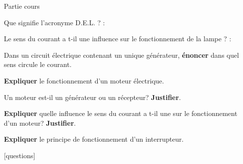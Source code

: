 \documentclass[11pt]{exam}		%
\begin{document}
{\huge Partie cours}
	\begin{questions}
		\question[1] 
		Que signifie l'acronyme D.E.L. ? : \dotfill

		\question[1] 
		Le sens du courant a t-il une 
		influence sur le fonctionnement 
		de la lampe ? : \dotfill

		\question[1] 
		Dans un circuit électrique contenant un unique générateur,
		\textbf{énoncer} dans quel sens circule 
		le courant.

		\question[1] \textbf{Expliquer} 
		le fonctionnement d'un moteur électrique.

		\question[1] 
		Un moteur est-il un générateur ou un récepteur? 
		\textbf{Justifier}.

		\question[1] 
		\textbf{Expliquer} quelle influence le sens du 
		courant a t-il une sur le fonctionnement d'un moteur? 
		\textbf{Justifier}.

		\question[2] 
		\textbf{Expliquer} le principe de fonctionnement
		d'un interrupteur.


\end{questions}

\vfill
\begin{center}
\setlength{\doublerulesep}{0.25in}
[questions]
\vspace{-25pt}
\end{center}
\end{document}
